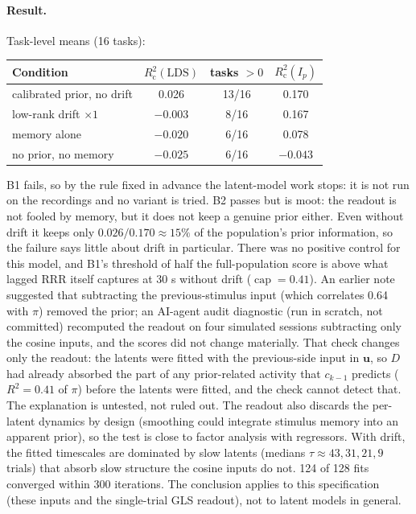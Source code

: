 \documentclass[11pt]{article}
\newcommand{\Rc}{R^2_{\mathrm{c}}}
\begin{document}
\paragraph{Result.} Task-level means (16 tasks):
\begin{center}
\begin{tabular}{lccc}
\toprule
Condition & $\Rc(\mathrm{LDS})$ & tasks $> 0$ & $\Rc(I_p)$ \\
\midrule
calibrated prior, no drift & 0.026 & 13/16 & 0.170 \\
low-rank drift $\times 1$ & $-0.003$ & 8/16 & 0.167 \\
memory alone & $-0.020$ & 6/16 & 0.078 \\
no prior, no memory & $-0.025$ & 6/16 & $-0.043$ \\
\bottomrule
\end{tabular}
\end{center}
B1 fails, so by the rule fixed in advance the latent-model work stops: it is not run on the recordings and no
variant is tried. B2 passes but is moot: the readout is not fooled by memory, but it does not keep a genuine prior
either. Even without drift it keeps only $0.026/0.170 \approx 15\%$ of the population's prior information, so the
failure says little about drift in particular. There was no positive control for this model, and B1's threshold of
half the full-population score is above what lagged RRR itself captures at 30 s without drift ($\operatorname{cap} =
0.41$). An earlier note suggested that subtracting the previous-stimulus input (which correlates 0.64 with $\pi$)
removed the prior; an AI-agent audit diagnostic (run in scratch, not committed) recomputed the readout on four
simulated sessions subtracting only the cosine inputs, and the scores did not change materially. That check changes
only the readout: the latents were fitted with the previous-side input in $\bm u$, so $D$ had already absorbed the part
of any prior-related activity that $c_{k-1}$ predicts ($R^2 = 0.41$ of $\pi$) before the latents were fitted, and the
check cannot detect that. The explanation is untested, not ruled out. The readout also discards the per-latent
dynamics by design (smoothing could integrate stimulus memory into an apparent prior), so the test is close to factor
analysis with regressors. With drift, the fitted timescales are dominated by slow latents (medians $\tau \approx 43, 31, 21, 9$
trials) that absorb slow structure the cosine inputs do not. 124 of 128 fits converged within 300 iterations. The
conclusion applies to this specification (these inputs and the single-trial GLS readout), not to latent models in
general.
\end{document}
